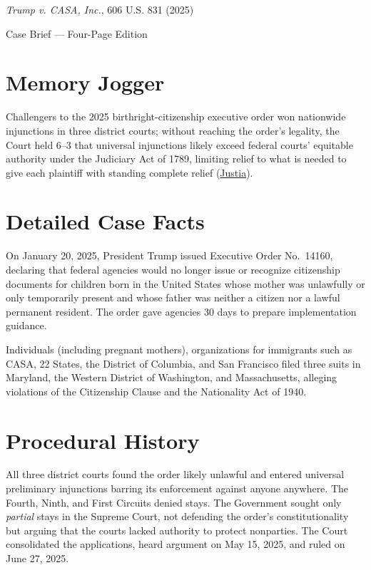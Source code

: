 \documentclass[12pt]{article}
\begin{document}
\begin{center}
{\LARGE \textit{Trump v. CASA, Inc.}, 606 U.S. 831 (2025)\par}
\vspace{0.8em}
{\large Case Brief --- Four-Page Edition\par}
\end{center}
\vspace{1em}

\section{Memory Jogger}

Challengers to the 2025 birthright-citizenship executive order won nationwide injunctions in three district courts; without reaching the order's legality, the Court held 6--3 that universal injunctions likely exceed federal courts' equitable authority under the Judiciary Act of 1789, limiting relief to what is needed to give each plaintiff with standing complete relief (\href{https://supreme.justia.com/cases/federal/us/606/24a884/}{Justia}).

\section{Detailed Case Facts}

On January 20, 2025, President Trump issued Executive Order No.~14160, declaring that federal agencies would no longer issue or recognize citizenship documents for children born in the United States whose mother was unlawfully or only temporarily present and whose father was neither a citizen nor a lawful permanent resident. The order gave agencies 30 days to prepare implementation guidance.

Individuals (including pregnant mothers), organizations for immigrants such as CASA, 22 States, the District of Columbia, and San Francisco filed three suits in Maryland, the Western District of Washington, and Massachusetts, alleging violations of the Citizenship Clause and the Nationality Act of 1940.

\section{Procedural History}

All three district courts found the order likely unlawful and entered universal preliminary injunctions barring its enforcement against anyone anywhere. The Fourth, Ninth, and First Circuits denied stays. The Government sought only \textit{partial} stays in the Supreme Court, not defending the order's constitutionality but arguing that the courts lacked authority to protect nonparties. The Court consolidated the applications, heard argument on May 15, 2025, and ruled on June 27, 2025.
\end{document}
